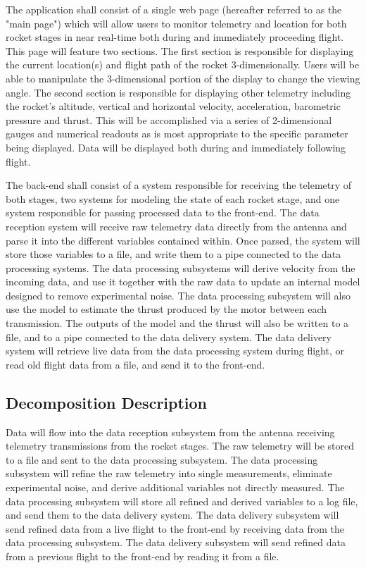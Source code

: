 \documentclass[journal,10pt,onecolumn,compsoc]{IEEEtran}
\begin{document}
		\noindent The application shall consist of a single web page (hereafter referred to as the "main page") which will allow users to monitor telemetry and location for both rocket stages in near real-time both during and immediately proceeding flight.
		This page will feature two sections.
		The first section is responsible for displaying the current location(s) and flight path of the rocket 3-dimensionally.
		Users will be able to manipulate the 3-dimensional portion of the display to change the viewing angle.
		The second section is responsible for displaying other telemetry including the rocket’s altitude, vertical and horizontal velocity, acceleration, barometric pressure and thrust.
		This will be accomplished via a series of 2-dimensional gauges and numerical readouts as is most appropriate to the specific parameter being displayed.
		Data will be displayed both during and immediately following flight.

		\noindent The back-end shall consist of a system responsible for receiving the telemetry of both stages, two systems for modeling the state of each rocket stage, and one system responsible for passing processed data to the front-end.
		The data reception system will receive raw telemetry data directly from the antenna and parse it into the different variables contained within.
		Once parsed, the system will store those variables to a file, and write them to a pipe connected to the data processing systems.
		The data processing subsystems will derive velocity from the incoming data, and use it together with the raw data to update an internal model designed to remove experimental noise.
		The data processing subsystem will also use the model to estimate the thrust produced by the motor between each transmission.
		The outputs of the model and the thrust will also be written to a file, and to a pipe connected to the data delivery system.
		The data delivery system will retrieve live data from the data processing system during flight, or read old flight data from a file, and send it to the front-end.
		
	\subsection{Decomposition Description}
		\noindent Data will flow into the data reception subsystem from the antenna receiving telemetry transmissions from the rocket stages.
		The raw telemetry will be stored to a file and sent to the data processing subsystem.
		The data processing subsystem will refine the raw telemetry into single measurements, eliminate experimental noise, and derive additional variables not directly measured.
		The data processing subsystem will store all refined and derived variables to a log file, and send them to the data delivery system.
		The data delivery subsystem will send refined data from a live flight to the front-end by receiving data from the data processing subsystem.
		The data delivery subsystem will send refined data from a previous flight to the front-end by reading it from a file.
\end{document}

